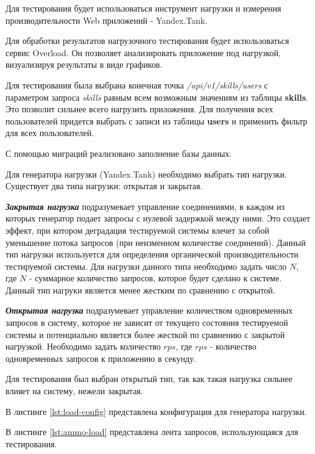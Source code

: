 Для тестирования будет использоваться инструмент нагрузки и измерения производительности Web приложений - Yandex.Tank\cite{yandex-tank}.  

Для обработки результатов нагрузочного тестирования будет использоваться сервис Overload\cite{yandex-overload}. Он позволяет анализировать приложение под нагрузкой, визуализируя результаты в виде графиков.  

Для тестирования была выбрана конечная точка \textit{/api/v1/skills/users} с 
параметром запроса \textit{skills} равным всем возможным значениям из таблицы \textbf{skills}.  
Это позволит сильнее всего нагрузить приложения.
Для получения всех пользователей придется выбрать с записи из таблицы \textbf{users} и применить фильтр для всех пользователей.  

С помощью миграций реализовано заполнение базы данных.  

Для генератора нагрузки (Yandex.Tank) необходимо выбрать тип нагрузки.  
Существует два типа нагрузки: открытая и закрытая.  

\textbf{\textit{Закрытая нагрузка}} подразумевает управление соединениями, в каждом из которых генератор подает запросы с нулевой задержкой между ними. Это создает эффект, при котором деградация тестируемой системы влечет за собой уменьшение потока запросов (при неизменном количестве соединений). Данный тип нагрузки используется для определения органической производительности тестируемой системы. 
Для нагрузки данного типа необходимо задать число $N$, где $N$ - суммарное количество запросов, которое будет сделано к системе. 
Данный тип нагруки является менее жестким по сравнению с открытой.

\textbf{\textit{Открытая нагрузка}} подразумевает управление количеством одновременных запросов в систему, которое не зависит от текущего состояния тестируемой системы и потенциально является более жесткой по сравнению с закрытой нагрузкой. Необходимо задать количество $rps$, где $rps$ - количество одновременных запросов к приложению в секунду.  

Для тестирования был выбран открытый тип, так как такая нагрузка сильнее влияет на систему, нежели закрытая.  

\newpage

В листинге \ref{lst:load-config} представлена конфигурация для генератора нагрузки.


\newpage
В листинге \ref{lst:ammo-load} представлена лента запросов, использующаяся для тестирования.

